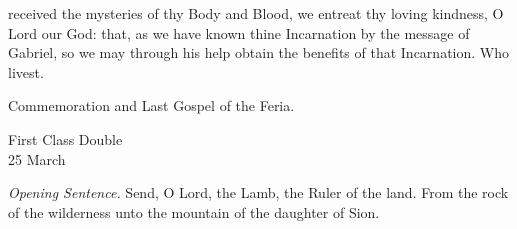 \postcommunion
{} received the mysteries of thy Body and Blood, we entreat thy loving kindness, O Lord our God: that, as we have known thine Incarnation by the message of Gabriel, so we may through his help obtain the benefits of that Incarnation. Who livest.

\begin{rubric}
	Commemoration and Last Gospel of the Feria.
\end{rubric}


\begin{inhead}
    {First Class Double\\
25 March}
\end{inhead}
\par\noindent
\textit{Opening Sentence.} Send, O Lord, the Lamb, the Ruler of the land. From the rock of the wilderness unto the mountain of the daughter of Sion.%





